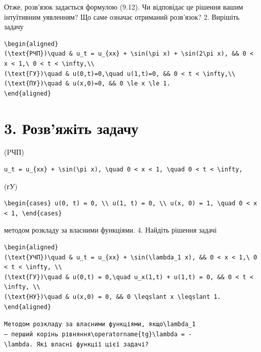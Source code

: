 \documentclass[
  ukrainian,
]{article}
\begin{document}
Отже, розв'язок задається формулою (9.12). Чи відповідає це рішення
вашим інтуїтивним уявленням? Що саме означає отриманий розв'язок? 2.
Вирішіть задачу

\begin{verbatim}
\begin{aligned}
(\text{РЧП})\quad & u_t = u_{xx} + \sin(\pi x) + \sin(2\pi x), && 0 < x < 1,\ 0 < t < \infty,\\
(\text{ГУ})\quad & u(0,t)=0,\quad u(1,t)=0, && 0 < t < \infty,\\
(\text{ПУ})\quad & u(x,0)=0, && 0 \le x \le 1.
\end{aligned}
\end{verbatim}

\section{3. Розв'яжіть
задачу}\label{ux440ux43eux437ux432ux44fux436ux456ux442ux44c-ux437ux430ux434ux430ux447ux443}

(PЧП)

\begin{verbatim}
u_t = u_{xx} + \sin(\pi x), \quad 0 < x < 1, \quad 0 < t < \infty,
\end{verbatim}

(гУ)

\begin{verbatim}
\begin{cases} u(0, t) = 0, \\ u(1, t) = 0, \\ u(x, 0) = 1, \quad 0 < x < 1, \end{cases}
\end{verbatim}

методом розкладу за власними функціями. 4. Найдіть рішення задачі

\begin{verbatim}
\begin{aligned}
(\text{УЧП})\quad & u_t = u_{xx} + \sin(\lambda_1 x), && 0 < x < 1,\ 0 < t < \infty, \\
(\text{ГУ})\quad & u(0,t) = 0,\quad u_x(1,t) + u(1,t) = 0, && 0 < t < \infty, \\
(\text{НУ})\quad & u(x,0) = 0, && 0 \leqslant x \leqslant 1.
\end{aligned}
\end{verbatim}

\texttt{Методом\ розкладу\ за\ власними\ функціями,\ якщо\textquotesingle{}\textbackslash{}lambda\_1\textquotesingle{}—\ перший\ корінь\ рівняння\textquotesingle{}\textbackslash{}operatorname\{tg\}\textbackslash{}lambda\ =\ -\textbackslash{}lambda\textquotesingle{}.\ Які\ власні\ функції\ цієї\ задачі?}
\end{document}
